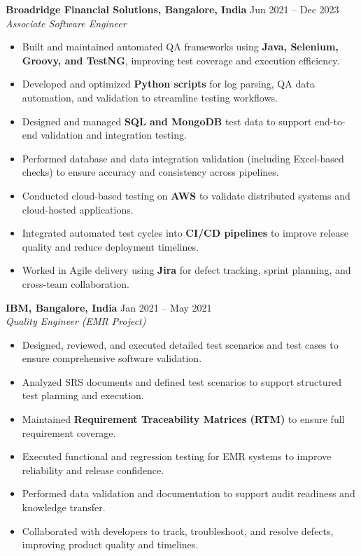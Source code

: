 \textbf{Broadridge Financial Solutions, Bangalore, India} \hfill Jun 2021 -- Dec 2023\\
\textit{Associate Software Engineer}\\
\begin{itemize}
  \item Built and maintained automated QA frameworks using \textbf{Java, Selenium, Groovy, and TestNG}, improving test coverage and execution efficiency.
  \item Developed and optimized \textbf{Python scripts} for log parsing, QA data automation, and validation to streamline testing workflows.
  \item Designed and managed \textbf{SQL and MongoDB} test data to support end-to-end validation and integration testing.
  \item Performed database and data integration validation (including Excel-based checks) to ensure accuracy and consistency across pipelines.
  \item Conducted cloud-based testing on \textbf{AWS} to validate distributed systems and cloud-hosted applications.
  \item Integrated automated test cycles into \textbf{CI/CD pipelines} to improve release quality and reduce deployment timelines.
  \item Worked in Agile delivery using \textbf{Jira} for defect tracking, sprint planning, and cross-team collaboration.
\end{itemize}

\textbf{IBM, Bangalore, India} \hfill Jan 2021 -- May 2021\\
\textit{Quality Engineer (EMR Project)}\\
\begin{itemize}
  \item Designed, reviewed, and executed detailed test scenarios and test cases to ensure comprehensive software validation.
  \item Analyzed SRS documents and defined test scenarios to support structured test planning and execution.
  \item Maintained \textbf{Requirement Traceability Matrices (RTM)} to ensure full requirement coverage.
  \item Executed functional and regression testing for EMR systems to improve reliability and release confidence.
  \item Performed data validation and documentation to support audit readiness and knowledge transfer.
  \item Collaborated with developers to track, troubleshoot, and resolve defects, improving product quality and timelines.
\end{itemize}

